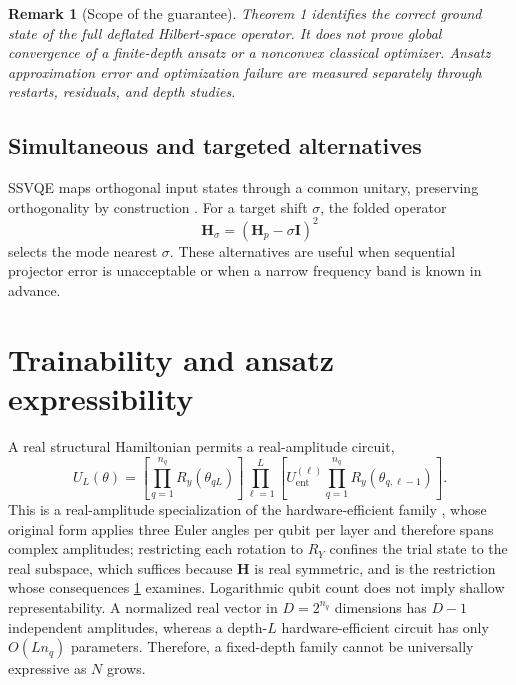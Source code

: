 \documentclass{ieeeaccess}
\newcommand{\Hq}{\mathbf{H}}
\newcommand{\I}{\mathbf{I}}
\newtheorem{remark}{Remark}
\begin{document}
\begin{remark}[Scope of the guarantee]\label{rem:scope}
Theorem 1 identifies the correct ground state of the full deflated Hilbert-space operator. It does not prove global convergence of a finite-depth ansatz or a nonconvex classical optimizer. Ansatz approximation error and optimization failure are measured separately through restarts, residuals, and depth studies.
\end{remark}

\subsection{Simultaneous and targeted alternatives}

SSVQE maps orthogonal input states through a common unitary, preserving orthogonality by construction \cite{Nakanishi2019}. For a target shift $\sigma$, the folded operator
\begin{equation}
\Hq_{\sigma}=(\Hq_p-\sigma\I)^2
\label{eq:folded}
\end{equation}
selects the mode nearest $\sigma$. These alternatives are useful when sequential projector error is unacceptable or when a narrow frequency band is known in advance.

\section{Trainability and ansatz expressibility}
\label{sec:trainability}

A real structural Hamiltonian permits a real-amplitude circuit,
\begin{equation}
U_L(\theta)=
\left[\prod_{q=1}^{n_q}R_y(\theta_{qL})\right]
\prod_{\ell=1}^{L}
\left[U_{\mathrm{ent}}^{(\ell)}\prod_{q=1}^{n_q}R_y(\theta_{q,\ell-1})\right].
\label{eq:ansatz}
\end{equation}
This is a real-amplitude specialization of the hardware-efficient family \cite{Kandala2017}, whose original form applies three Euler angles per qubit per layer and therefore spans complex amplitudes; restricting each rotation to $R_Y$ confines the trial state to the real subspace, which suffices because $\Hq$ is real symmetric, and is the restriction whose consequences \cref{sec:trainability} examines. Logarithmic qubit count does not imply shallow representability. A normalized real vector in $D=2^{n_q}$ dimensions has $D-1$ independent amplitudes, whereas a depth-$L$ hardware-efficient circuit has only $O(Ln_q)$ parameters. Therefore, a fixed-depth family cannot be universally expressive as $N$ grows.
\end{document}
